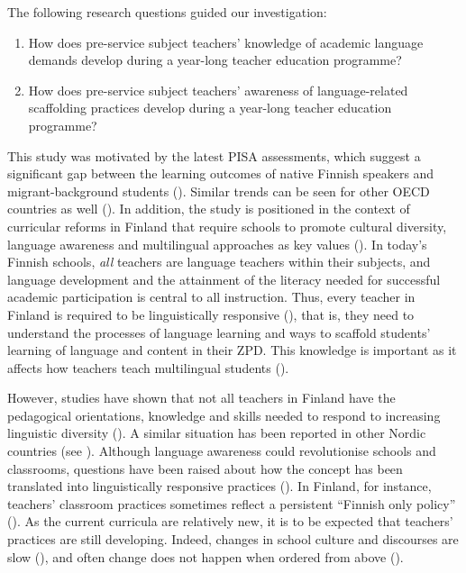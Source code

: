 \documentclass[output=paper]{langscibook}
\begin{document}
The following research questions guided our investigation: 

\begin{enumerate}
\sloppy
\item How does pre-service subject teachers’ knowledge of academic language demands develop during a year-long teacher education programme? 
\item How does pre-service subject teachers’ awareness of language-related scaffolding practices develop during a year-long teacher education programme? 
\end{enumerate}

This study was motivated by the latest PISA assessments, which suggest a significant gap between the learning outcomes of native Finnish speakers and migrant-background students (\citealt{Harju-LuukkainenEtAl2015,LeinoEtAl2019,VettenrantaEtAl2016}). Similar trends can be seen for other OECD countries as well (\citealt{Schleicher2019}). In addition, the study is positioned in the context of curricular reforms in Finland that require schools to promote cultural diversity, language awareness and multilingual approaches as key values (\citealt{EDUFI2014, EDUFI2019}). In today’s Finnish schools, \textit{all} teachers are language teachers within their subjects, and language development and the attainment of the literacy needed for successful academic participation is central to all instruction. Thus, every teacher in Finland is required to be linguistically responsive (\citealt{LucasVillegas2013}), that is, they need to understand the processes of language learning and ways to scaffold students’ learning of language and content in their ZPD. This knowledge is important as it affects how teachers teach multilingual students (\citealt{LucasVillegas2013}).

However, studies have shown that not all teachers in Finland have the pedagogical orientations, knowledge and skills needed to respond to increasing linguistic diversity (\citealt{AlisaariEtAl2019,Repo2020,SuuriniemiSatokangas2023}). A similar situation has been reported in other Nordic countries (see \citealt{Iversen2021,Lundberg2019,Rosen2019-1}). Although language awareness could revolutionise schools and classrooms, questions have been raised about how the concept has been translated into linguistically responsive practices (\citealt{AhlholmEtAl2021,ZilliacusEtAl2017}). In Finland, for instance, teachers’ classroom practices sometimes reflect a persistent “Finnish only policy” (\citealt{AlisaariEtAl2019}). As the current curricula are relatively new, it is to be expected that teachers’ practices are still developing. Indeed, changes in school culture and discourses are slow (\citealt{Repo2020,TarnanenPalviainen2018}), and often change does not happen when ordered from above (\citealt{HornbergerJohnson2007}).
\end{document}
